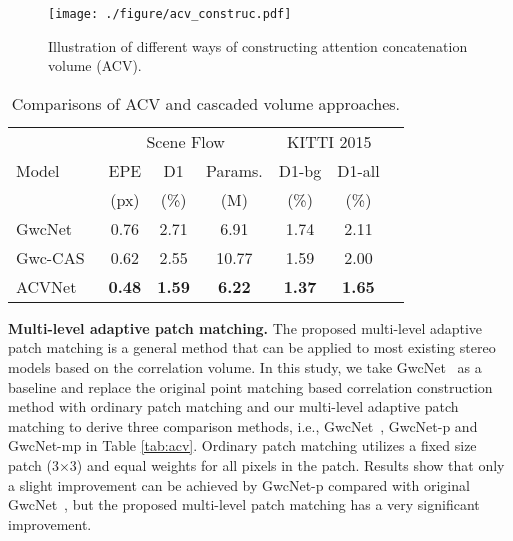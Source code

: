 \documentclass[10pt,twocolumn,letterpaper]{article}
\begin{document}
\begin{figure*}
\centering
\texttt{[image: ./figure/acv\_construc.pdf]} \caption{Illustration of different ways of constructing attention concatenation volume (ACV).}
\label{fig:three_acv}
\vspace{-10pt}
\end{figure*} 

\begin{table} 
\begin{center}
\small
\begin{tabular}{l|ccc|ccc}
\hline
\multirow{3}{*}{Model} & \multicolumn{3}{c|}{Scene Flow} & \multicolumn{2}{c}{KITTI 2015}\\ 
 & EPE &D1 &Params. &D1-bg & D1-all\\ 
&(px) &(\%) &(M) &(\%) & (\%)\\
 
\hline
GwcNet~\cite{guo2019group} & 0.76 &2.71 &6.91 & 1.74 & 2.11\\
Gwc-CAS~\cite{gu2020cascade} & 0.62 & 2.55 &10.77 & 1.59 & 2.00 \\
ACVNet & \textbf{0.48} &\textbf{1.59} &\textbf{6.22} & \textbf{1.37} &\textbf{1.65}\\
\hline
\end{tabular}
\end{center}
\vspace{-10pt}
\caption{Comparisons of ACV and cascaded volume approaches.}\label{tab:acv_cascade}
\vspace{-15pt}
\end{table}

\textbf{Multi-level adaptive patch matching.}  The proposed multi-level adaptive patch matching is a general method that can be applied to most existing stereo models based on the correlation volume. In this study, we take GwcNet~\cite{guo2019group} as a baseline and replace the original point matching based correlation construction method with ordinary patch matching and our multi-level adaptive patch matching to derive three comparison methods, i.e., GwcNet~\cite{guo2019group}, GwcNet-p and GwcNet-mp in Table \ref{tab:acv}. Ordinary patch matching utilizes a fixed size patch (3$\times$3) and equal weights for all pixels in the patch. Results show that only a slight improvement can be achieved by GwcNet-p compared with original GwcNet~\cite{guo2019group}, but the proposed multi-level patch matching has a very significant improvement.
\end{document}
